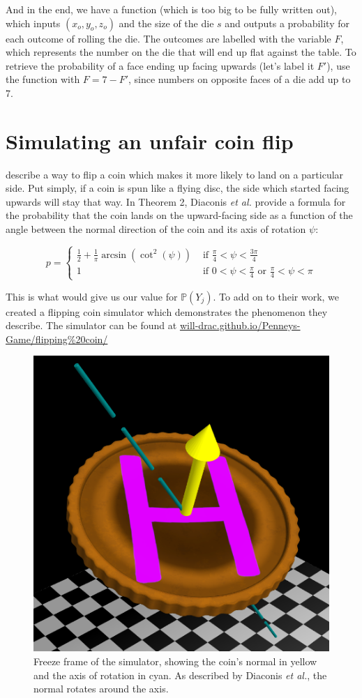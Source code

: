 \documentclass[english,12pt,a4paper,final]{article}
\begin{document}
And in the end, we have a function (which is too big to be fully written out), which inputs $(x_o, y_o, z_o)$ and the size of the die $s$ and outputs a probability for each outcome of rolling the die. The outcomes are labelled with the variable $F$, which represents the number on the die that will end up flat against the table. To retrieve the probability of a face ending up facing upwards (let's label it $F'$), use the function with $F=7-F'$, since numbers on opposite faces of a die add up to 7.

\section{Simulating an unfair coin flip}

\textcite{unfairCoin} describe a way to flip a coin which makes it more likely to land on a particular side. Put simply, if a coin is spun like a flying disc, the side which started facing upwards will stay that way. In Theorem 2, Diaconis \textit{et al.} provide a formula for the probability that the coin lands on the upward-facing side as a function of the angle between the normal direction of the coin and its axis of rotation $\psi$:

\begin{equation}\label{coinProbByAngle}
	p = \begin{cases}
		\frac{1}{2} + \frac{1}{\pi}\arcsin(\cot^2(\psi)) & \text{ if } \frac{\pi}{4}<\psi<\frac{3\pi}{4}
		\\
		1 & \text{ if } 0<\psi<\frac{\pi}{4} \text{ or } \frac{\pi}{4} < \psi < \pi
	\end{cases}
\end{equation}

This is what would give us our value for $\mathbb{P}(Y_j)$. To add on to their work, we created a flipping coin simulator which demonstrates the phenomenon they describe. The simulator can be found at \href{https://will-drac.github.io/Penneys-Game/flipping%20coin/}{will-drac.github.io/Penneys-Game/flipping\%20coin/}

\begin{figure}[H]
	\centering
	\includegraphics[width=0.5\linewidth]{flippingCoin}
	\caption{Freeze frame of the simulator, showing the coin's normal in yellow and the axis of rotation in cyan. As described by Diaconis \textit{et al.}, the normal rotates around the axis.}
	\label{fig:flippingcoin}
\end{figure}
\end{document}
